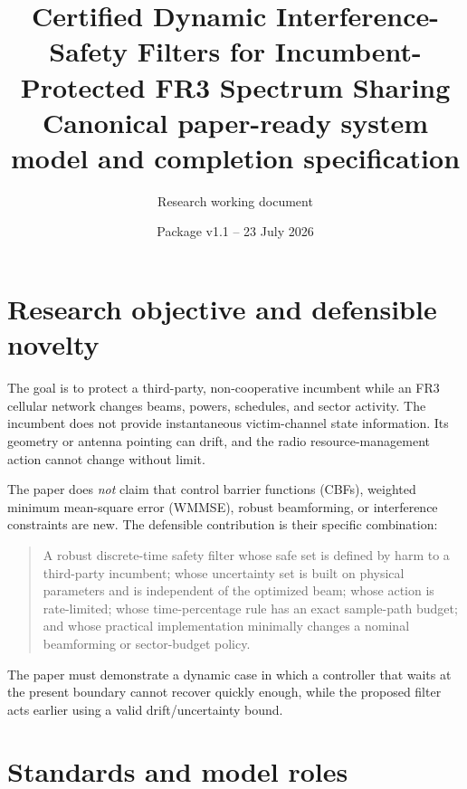 \documentclass[11pt]{article}
\title{\textbf{Certified Dynamic Interference-Safety Filters for Incumbent-Protected FR3 Spectrum Sharing}\\
\large Canonical paper-ready system model and completion specification}
\author{Research working document}
\date{Package v1.1 -- 23 July 2026}
\begin{document}
\maketitle

\begin{center}
\end{center}

\tableofcontents
\newpage

\section{Research objective and defensible novelty}

The goal is to protect a third-party, non-cooperative incumbent while an FR3 cellular network changes beams, powers, schedules, and sector activity. The incumbent does not provide instantaneous victim-channel state information. Its geometry or antenna pointing can drift, and the radio resource-management action cannot change without limit.

The paper does \emph{not} claim that control barrier functions (CBFs), weighted minimum mean-square error (WMMSE), robust beamforming, or interference constraints are new. The defensible contribution is their specific combination:

\begin{quote}
A robust discrete-time safety filter whose safe set is defined by harm to a third-party incumbent; whose uncertainty set is built on physical parameters and is independent of the optimized beam; whose action is rate-limited; whose time-percentage rule has an exact sample-path budget; and whose practical implementation minimally changes a nominal beamforming or sector-budget policy.
\end{quote}

The paper must demonstrate a dynamic case in which a controller that waits at the present boundary cannot recover quickly enough, while the proposed filter acts earlier using a valid drift/uncertainty bound.

\section{Standards and model roles}
\end{document}
